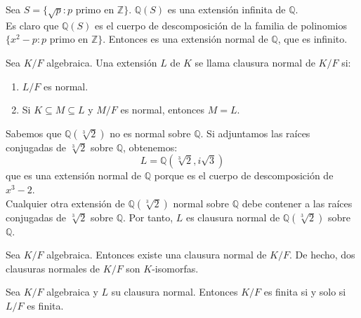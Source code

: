 \begin{example}
    Sea $S = \{ \sqrt{p} : p \text{ primo en } \mathbb{Z} \}$. $\mathbb{Q}(S)$ es una extensión infinita de $\mathbb{Q}$.\\
    Es claro que $\mathbb{Q}(S)$ es el cuerpo de descomposición de la familia de polinomios $\{ x^2-p : p \text{ primo en } \mathbb{Z} \}$.
    Entonces es una extensión normal de $\mathbb{Q}$, que es infinito.
\end{example}

\begin{definition}
    Sea $K/F$ algebraica. Una extensión $L$ de $K$ se llama clausura normal de $K/F$ si:
    \begin{enumerate}
        \item $L/F$ es normal.
        \item Si $K \subseteq M \subseteq L$ y $M/F$ es normal, entonces $M = L$.
    \end{enumerate}
\end{definition}

\begin{example}
    Sabemos que $\mathbb{Q}(\sqrt[3]{2})$ no es normal sobre $\mathbb{Q}$. Si adjuntamos las raíces conjugadas de $\sqrt[3]{2}$ sobre $\mathbb{Q}$, obtenemos:
    $$L = \mathbb{Q}(\sqrt[3]{2}, i\sqrt{3})$$
    que es una extensión normal de $\mathbb{Q}$ porque es el cuerpo de descomposición de $x^3-2$.\\
    Cualquier otra extensión de $\mathbb{Q}(\sqrt[3]{2})$ normal sobre $\mathbb{Q}$ debe contener a las raíces conjugadas de $\sqrt[3]{2}$ sobre $\mathbb{Q}$.
    Por tanto, $L$ es clausura normal de $\mathbb{Q}(\sqrt[3]{2})$ sobre $\mathbb{Q}$.
\end{example}

\begin{theorem}
    Sea $K/F$ algebraica. Entonces existe una clausura normal de $K/F$. De hecho, dos clausuras normales de $K/F$ son $K$-isomorfas.
\end{theorem}

\begin{proposition}
    Sea $K/F$ algebraica y $L$ su clausura normal. Entonces $K/F$ es finita si y solo si $L/F$ es finita.
\end{proposition}